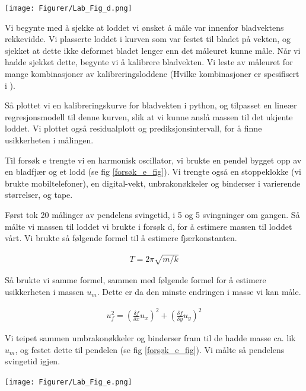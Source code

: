 \bigskip \hfil
\texttt{[image: Figurer/Lab\_Fig\_d.png]} 
 \label{forsøk_d_fig}
\par \bigskip

Vi begynte med å sjekke at loddet vi ønsket å måle var innenfor bladvektens rekkevidde. Vi plasserte loddet i kurven som var festet til bladet på vekten, og sjekket at dette ikke deformet bladet lenger enn det måleuret kunne måle.
Når vi hadde sjekket dette, begynte vi å kalibrere bladvekten. Vi leste av måleuret for mange kombinasjoner av kalibreringsloddene (Hvilke kombinasjoner er spesifisert i ). \medskip

Så plottet vi en kalibreringskurve for bladvekten i python, og tilpasset en lineær regresjonsmodell til denne kurven, slik at vi kunne anslå massen til det ukjente loddet. Vi plottet også residualplott og prediksjonsintervall, for å finne usikkerheten i målingen. \bigskip

Til forsøk e trengte vi en harmonisk oscillator, vi brukte en pendel bygget opp av en bladfjær og et lodd (se fig \ref{forsøk_e_fig}). Vi trengte også en stoppeklokke (vi brukte mobiltelefoner), en digital-vekt, unbrakonøkkeler og binderser i varierende størrelser, og tape.

Først tok 20 målinger av pendelens svingetid, i 5 og 5 svingninger om gangen. Så målte vi massen til loddet vi brukte i forsøk d, for å estimere massen til loddet vårt. Vi brukte så følgende formel til å estimere fjærkonstanten.

\begin{align}
    T =2\pi\sqrt{m/k} \label{periodformula}
\end{align}

Så brukte vi samme formel, sammen med følgende formel for å estimere usikkerheten i massen $u_m$. Dette er da den minste endringen i masse vi kan måle.

\begin{align}
    u_f^2 = \left(\frac{\delta f}{\delta x} u_x\right)^2 + \left(\frac{\delta f}{\delta y} u_y\right)^2\label{gu}
\end{align}

Vi teipet sammen umbrakonøkkeler og binderser fram til de hadde masse ca. lik $u_m$, og festet dette til pendelen (se fig \ref{forsøk_e_fig}). Vi målte så pendelens svingetid igjen.

\bigskip \hfil
\texttt{[image: Figurer/Lab\_Fig\_e.png]} 
 \label{forsøk_e_fig}
\par \bigskip

